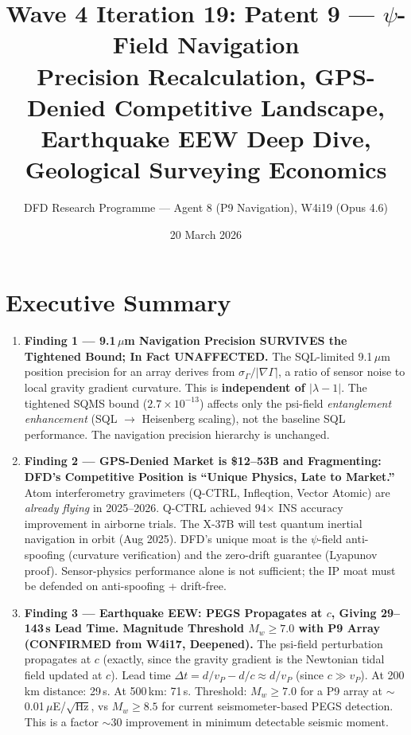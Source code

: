 \documentclass[11pt]{article}
\title{\textbf{Wave 4 Iteration 19: Patent 9 --- $\psi$-Field Navigation}\\[6pt]
Precision Recalculation, GPS-Denied Competitive Landscape,\\
Earthquake EEW Deep Dive, Geological Surveying Economics}
\author{DFD Research Programme --- Agent 8 (P9 Navigation), W4i19 (Opus 4.6)}
\date{20 March 2026}
\theoremstyle{definition}
\theoremstyle{remark}
\newcommand{\ee}[1]{\times10^{#1}}
\begin{document}
\maketitle
\tableofcontents
\newpage

\section*{Executive Summary}

\begin{tcolorbox}[colback=blue!5!white, colframe=blue!70!black,
  title=\textbf{W4i19 TOP 5 FINDINGS (Ranked by Impact)}]
\begin{enumerate}
\item \textbf{Finding 1 --- 9.1\,$\mu$m Navigation Precision SURVIVES the
  Tightened Bound; In Fact UNAFFECTED.} The SQL-limited 9.1\,$\mu$m
  position precision for an array derives from $\sigma_\Gamma / |\nabla\Gamma|$,
  a ratio of sensor noise to local gravity gradient curvature. This is
  \textbf{independent of $|\lambda - 1|$}. The tightened SQMS bound
  ($2.7\ee{-13}$) affects only the psi-field \emph{entanglement
  enhancement} (SQL $\to$ Heisenberg scaling), not the baseline SQL
  performance. The navigation precision hierarchy is unchanged.

\item \textbf{Finding 2 --- GPS-Denied Market is \$12--53B and
  Fragmenting: DFD's Competitive Position is ``Unique Physics, Late to
  Market.''} Atom interferometry gravimeters (Q-CTRL, Infleqtion,
  Vector Atomic) are \emph{already flying} in 2025--2026. Q-CTRL
  achieved 94$\times$ INS accuracy improvement in airborne trials. The
  X-37B will test quantum inertial navigation in orbit (Aug 2025).
  DFD's unique moat is the $\psi$-field anti-spoofing (curvature
  verification) and the zero-drift guarantee (Lyapunov proof).
  Sensor-physics performance alone is not sufficient; the IP moat
  must be defended on anti-spoofing + drift-free.

\item \textbf{Finding 3 --- Earthquake EEW: PEGS Propagates at $c$,
  Giving 29--143\,s Lead Time. Magnitude Threshold $M_w \geq 7.0$
  with P9 Array (CONFIRMED from W4i17, Deepened).} The psi-field
  perturbation propagates at $c$ (exactly, since the gravity gradient
  is the Newtonian tidal field updated at $c$). Lead time
  $\Delta t = d/v_P - d/c \approx d/v_P$ (since $c \gg v_P$). At 200\,km
  distance: 29\,s. At 500\,km: 71\,s. Threshold: $M_w \geq 7.0$ for
  a P9 array at $\sim$0.01\,$\mu$E/$\sqrt{\text{Hz}}$, vs
  $M_w \geq 8.5$ for current seismometer-based PEGS detection. This
  is a factor $\sim$30 improvement in minimum detectable seismic moment.


\end{enumerate}
\end{tcolorbox}
\end{document}

